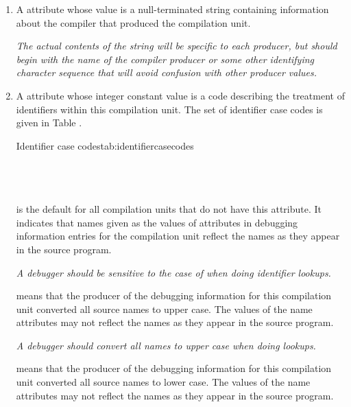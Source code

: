 \begin{enumerate}[1. ]
\item  \hypertarget{chap:DWATproducercompileridentification}{}
A \DWATproducerDEFN{} attribute
whose value is a null-terminated string containing
information about the compiler that produced the compilation unit.

\textit{The actual contents of
the string will be specific to each producer, but should
begin with the name of the compiler
\bb
producer
\eb
or some other
identifying character sequence that will avoid confusion
with other producer values.}

\item  \hypertarget{chap:DWATidentifiercaseidentifiercaserule}{}
A \DWATidentifiercaseDEFN{} attribute
 whose integer
constant value is a code describing the treatment
of identifiers within this compilation unit. The
set of identifier case codes is given in
Table .

\begin{simplenametable}{Identifier case codes}{tab:identifiercasecodes}
\DWIDcasesensitive{}      \\
\DWIDupcase{}             \\
\DWIDdowncase{}           \\
\DWIDcaseinsensitive{}    \\
\end{simplenametable}

\DWIDcasesensitiveTARG{} is the default for all compilation units
that do not have this attribute.  It indicates that names given
as the values of \DWATname{} attributes
in debugging information
entries for the compilation unit reflect the names as they
appear in the source program.

\textit{A debugger should be sensitive
to the case of  when doing identifier
lookups.}

\DWIDupcaseTARG{} means that the
producer of the debugging
information for this compilation unit converted all source
names to upper case. The values of the name attributes may not
reflect the names as they appear in the source program.

\textit{A debugger should convert all names to upper case
when doing lookups.}

\DWIDdowncaseTARG{} means that the producer of the debugging
information for this compilation unit converted all source
names to lower case. The values of the name attributes may not
reflect the names as they appear in the source program.


\end{enumerate}
